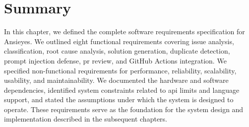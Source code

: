 \section{Summary}

In this chapter, we defined the complete software requirements specification for Ansieyes. We outlined eight functional requirements covering issue analysis, classification, root cause analysis, solution generation, duplicate detection, prompt injection defense, \gls{pr} review, and GitHub Actions integration. We specified non-functional requirements for performance, reliability, scalability, usability, and maintainability. We documented the hardware and software dependencies, identified system constraints related to \gls{api} limits and language support, and stated the assumptions under which the system is designed to operate. These requirements serve as the foundation for the system design and implementation described in the subsequent chapters.
